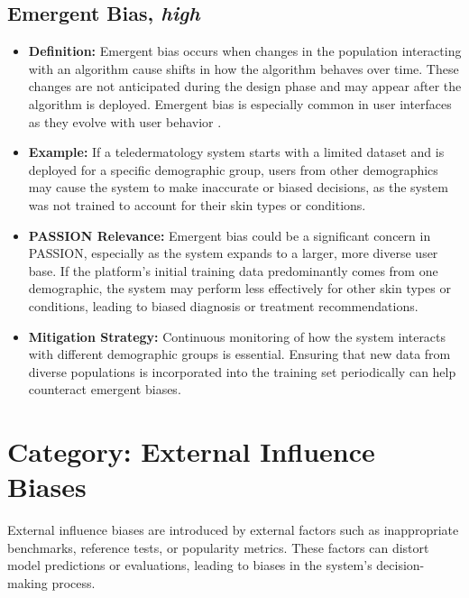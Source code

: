 \begin{refsection}
		\subsection{Emergent Bias, \textit{high}}
		\begin{itemize}
			\item \textbf{Definition:} Emergent bias occurs when changes in the population interacting with an algorithm cause shifts in how the algorithm behaves over time. These changes are not anticipated during the design phase and may appear after the algorithm is deployed. Emergent bias is especially common in user interfaces as they evolve with user behavior \autocite{M53_Friedman_1996}.
			\item \textbf{Example:} If a teledermatology system starts with a limited dataset and is deployed for a specific demographic group, users from other demographics may cause the system to make inaccurate or biased decisions, as the system was not trained to account for their skin types or conditions.
			\item \textbf{PASSION Relevance:} Emergent bias could be a significant concern in PASSION, especially as the system expands to a larger, more diverse user base. If the platform's initial training data predominantly comes from one demographic, the system may perform less effectively for other skin types or conditions, leading to biased diagnosis or treatment recommendations.
			\item \textbf{Mitigation Strategy:} Continuous monitoring of how the system interacts with different demographic groups is essential. Ensuring that new data from diverse populations is incorporated into the training set periodically can help counteract emergent biases.
		\end{itemize}
		
		\section{\textbf{Category:} External Influence Biases}
		External influence biases are introduced by external factors such as inappropriate benchmarks, reference tests, or popularity metrics. These factors can distort model predictions or evaluations, leading to biases in the system's decision-making process.
		

\end{refsection}
